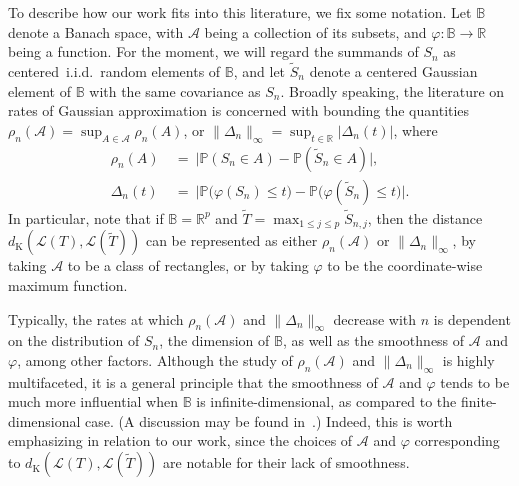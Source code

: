 \documentclass[aos,preprint]{imsart}
\numberwithin{equation}{section}
\theoremstyle{plain}
\newcommand{\R}{\mathbb{R}}
\renewcommand{\P}{\mathbb{P}}
\newcommand{\1}{{\bf{1}}}
\newcommand{\0}{\mathbf{0}}
\begin{document}
 To describe how our work fits into this literature, we fix some notation. Let $\mathbb{B}$ denote a Banach space, with $\mathscr{A}$ being a collection of its subsets, and $\varphi:\mathbb{B}\to\R$ being a function. For the moment, we will regard the summands of $S_n$ as centered~i.i.d.~random elements of $\mathbb{B}$, and let $\tilde S_n$ denote a centered Gaussian element of $\mathbb{B}$ with the same covariance as $S_n$. Broadly speaking, the literature on rates of Gaussian approximation is concerned with bounding the  quantities 
 $\rho_n(\mathscr{A})=\sup_{A\in\mathscr{A}}\rho_n(A)$, or $\|\Delta_n\|_{\infty}=\sup_{t\in\R}|\Delta_n(t)|$, where
%
 \begin{align}
 \rho_n(A) & \ = \  \Big|\P(S_n\in A) - \P(\tilde S_n\in A)\Big|,\label{eqn:rhodef}\\[0.2cm]
 \Delta_n(t) & \ = \ \Big|\P\big(\varphi(S_n)\leq t\big) - \P\big(\varphi(\tilde S_n)\leq t\big)\Big|.\label{eqn:deltadef}
 \end{align}
  In particular, note that if $\mathbb{B}=\R^p$ and $\tilde T=\max_{1\leq j\leq p} \tilde S_{n,j}$, then the distance $d_{\text{K}}(\mathcal{L}(T),\mathcal{L}(\tilde T))$ can be represented as either $\rho_n(\mathscr{A})$ or $\|\Delta_n\|_{\infty}$, by taking $\mathscr{A}$ to be a class of rectangles, or by taking $\varphi$ to be the coordinate-wise maximum function.
  
   Typically, the rates at which $\rho_n(\mathscr{A})$ and $\|\Delta_n\|_{\infty}$ decrease with $n$ is dependent on the distribution of $S_n$, the dimension of $\mathbb{B}$, as well as the smoothness of $\mathscr{A}$ and $\varphi$, among other factors. Although the study of $\rho_n(\mathscr{A})$ and $\|\Delta_n\|_{\infty}$ is highly multifaceted, it is a general principle that the smoothness of $\mathscr{A}$ and $\varphi$ tends to be much more influential when $\mathbb{B}$ is infinite-dimensional, as compared to the finite-dimensional case. (A discussion may be found in~\citep{Bentkus:1993}.) Indeed, this is worth emphasizing in relation to our work, since the choices of $\mathscr{A}$ and $\varphi$ corresponding to $d_{\text{K}}(\mathcal{L}(T),\mathcal{L}(\tilde T))$ are notable for their lack of smoothness.
   
\end{document}
